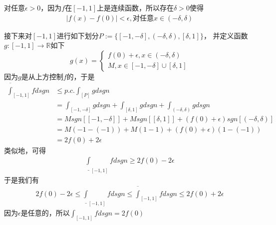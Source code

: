 \documentclass{article}
\begin{document}
对任意$\epsilon > 0$，因为$f$在$[-1, 1]$上是连续函数，所以存在$\delta > 0$使得
\begin{align*}
  |f(x) - f(0)| < \epsilon, \text{对任意}x \in (-\delta, \delta)
\end{align*}

接下来对$[-1,1]$进行如下划分$P := \{[-1, -\delta], (-\delta, \delta), [\delta, 1]\}$，
并定义函数$g: [-1, 1] \to \mathbb{R}$如下
\begin{equation*}
  g(x) =
  \begin{cases*}
    f(0) + \epsilon, x \in (-\delta, \delta) \\
    M, x \in [-1, -\delta] \cup [\delta, 1]
  \end{cases*}
\end{equation*}
因为$g$是从上方控制$f$的，于是
\begin{align*}
  \overline{\int}_{[-1, 1]} f dsgn & \leq p.c.\int_{[P]} g dsgn                                                                  \\
                                   & = \int_{[-1, -\delta]} g dsgn + \int_{[\delta, 1]} g dsgn + \int_{(-\delta, \delta)} g dsgn \\
                                   & = M sgn[[-1, -\delta]] + M sgn[[\delta, 1]] + (f(0) + \epsilon)sgn[(-\delta, \delta)]       \\
                                   & = M (-1 - (-1)) + M (1 - 1) + (f(0) + \epsilon) (1 - (-1))                                  \\
                                   & = 2f(0) + 2\epsilon
\end{align*}
类似地，可得
\begin{align*}
  \underline{\int}_{[-1, 1]} f dsgn \geq 2f(0) - 2\epsilon
\end{align*}
于是我们有
\begin{align*}
  2f(0) - 2\epsilon \leq \underline{\int}_{[-1, 1]} f dsgn \leq \overline{\int}_{[-1, 1]} f dsgn \leq 2f(0) + 2\epsilon
\end{align*}
因为$\epsilon$是任意的，所以$\int_{[-1, 1]} f dsgn = 2f(0)$
\end{document}
